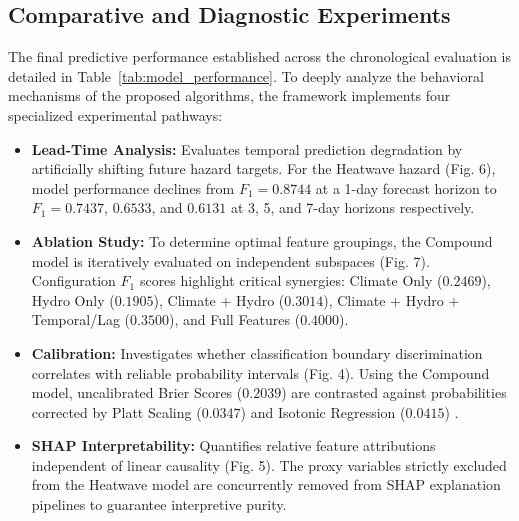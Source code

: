 \subsection{Comparative and Diagnostic Experiments}
The final predictive performance established across the chronological evaluation is detailed in Table~\ref{tab:model_performance}. To deeply analyze the behavioral mechanisms of the proposed algorithms, the framework implements four specialized experimental pathways:
\begin{itemize}
    \item \textbf{Lead-Time Analysis:} Evaluates temporal prediction degradation by artificially shifting future hazard targets. For the Heatwave hazard (Fig. 6), model performance declines from $F_1 = 0.8744$ at a 1-day forecast horizon to $F_1 = 0.7437$, $0.6533$, and $0.6131$ at 3, 5, and 7-day horizons respectively. 
    \item \textbf{Ablation Study:} To determine optimal feature groupings, the Compound model is iteratively evaluated on independent subspaces (Fig. 7). Configuration $F_1$ scores highlight critical synergies: Climate Only ($0.2469$), Hydro Only ($0.1905$), Climate + Hydro ($0.3014$), Climate + Hydro + Temporal/Lag ($0.3500$), and Full Features ($0.4000$).
    \item \textbf{Calibration:} Investigates whether classification boundary discrimination correlates with reliable probability intervals (Fig. 4). Using the Compound model, uncalibrated Brier Scores ($0.2039$) are contrasted against probabilities corrected by Platt Scaling ($0.0347$) \cite{Platt1999} and Isotonic Regression ($0.0415$) \cite{Zadrozny2002}. 
    \item \textbf{SHAP Interpretability:} Quantifies relative feature attributions independent of linear causality (Fig. 5). The proxy variables strictly excluded from the Heatwave model are concurrently removed from SHAP explanation pipelines to guarantee interpretive purity.
\end{itemize}

\begin{table}[htbp]
\caption{Final Offline Test Performance (2016--2018)}
\begin{center}
\label{tab:model_performance}
\end{center}
\end{table}

